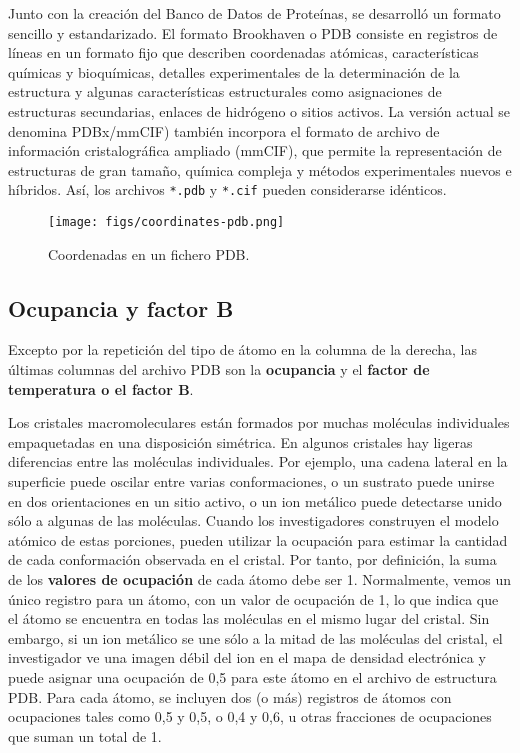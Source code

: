 Junto con la creación del Banco de Datos de Proteínas, se desarrolló un formato sencillo y estandarizado. El formato Brookhaven o PDB consiste en registros de líneas en un formato fijo que describen coordenadas atómicas, características químicas y bioquímicas, detalles experimentales de la determinación de la estructura y algunas características estructurales como asignaciones de estructuras secundarias, enlaces de hidrógeno o sitios activos. La versión actual se denomina PDBx/mmCIF) también incorpora el formato de archivo de información cristalográfica ampliado (mmCIF), que permite la representación de estructuras de gran tamaño, química compleja y métodos experimentales nuevos e híbridos. Así, los archivos \texttt{*.pdb} y \texttt{*.cif} pueden considerarse idénticos.

\begin{figure}[h]
\centering
\texttt{[image: figs/coordinates-pdb.png]}
\caption{Coordenadas en un fichero PDB.}
\end{figure}

\subsection{Ocupancia y factor B}
Excepto por la repetición del tipo de átomo en la columna de la derecha, las últimas columnas del archivo PDB son la \textbf{ocupancia} y el \textbf{factor de temperatura o el factor B}.

Los cristales macromoleculares están formados por muchas moléculas individuales empaquetadas en una disposición simétrica. En algunos cristales hay ligeras diferencias entre las moléculas individuales. Por ejemplo, una cadena lateral en la superficie puede oscilar entre varias conformaciones, o un sustrato puede unirse en dos orientaciones en un sitio activo, o un ion metálico puede detectarse unido sólo a algunas de las moléculas. Cuando los investigadores construyen el modelo atómico de estas porciones, pueden utilizar la ocupación para estimar la cantidad de cada conformación observada en el cristal. Por tanto, por definición, la suma de los \textbf{valores de ocupación} de cada átomo debe ser 1. Normalmente, vemos un único registro para un átomo, con un valor de ocupación de 1, lo que indica que el átomo se encuentra en todas las moléculas en el mismo lugar del cristal. Sin embargo, si un ion metálico se une sólo a la mitad de las moléculas del cristal, el investigador ve una imagen débil del ion en el mapa de densidad electrónica y puede asignar una ocupación de 0,5 para este átomo en el archivo de estructura PDB. Para cada átomo, se incluyen dos (o más) registros de átomos con ocupaciones tales como 0,5 y 0,5, o 0,4 y 0,6, u otras fracciones de ocupaciones que suman un total de 1.

